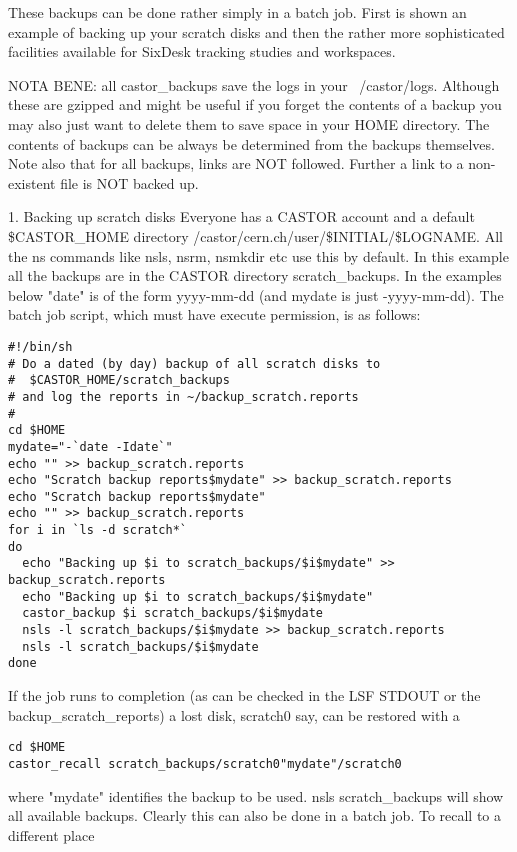 \documentclass{cernatsnote}    %
\begin{document}
 These backups can be done rather simply in a batch job. First is shown an example of 
backing up your scratch disks and then the rather more sophisticated
facilities available for SixDesk tracking studies and workspaces.

NOTA BENE: all castor\_backups save the logs in your ~/castor/logs. Although
these are gzipped and might be useful if you forget the contents of a backup
you may also just want to delete them to save space in your HOME directory.
The contents of backups can be always be determined from the backups
themselves. Note also that for all backups, links are NOT followed. Further
a link to a non-existent file is NOT backed up.

 1. Backing up scratch disks
 Everyone has a CASTOR account and a default \$CASTOR\_HOME directory
/castor/cern.ch/user/\$INITIAL/\$LOGNAME. All the ns commands like
nsls, nsrm, nsmkdir etc use this by default. In this example
all the backups are in the CASTOR directory scratch\_backups. 
In the examples below "date" is of the form yyyy-mm-dd (and mydate is
just -yyyy-mm-dd).
The batch job script, which must have execute permission, is as follows:
\begin{verbatim}
#!/bin/sh
# Do a dated (by day) backup of all scratch disks to 
#  $CASTOR_HOME/scratch_backups
# and log the reports in ~/backup_scratch.reports
#
cd $HOME
mydate="-`date -Idate`"
echo "" >> backup_scratch.reports
echo "Scratch backup reports$mydate" >> backup_scratch.reports
echo "Scratch backup reports$mydate"
echo "" >> backup_scratch.reports
for i in `ls -d scratch*`
do
  echo "Backing up $i to scratch_backups/$i$mydate" >> backup_scratch.reports
  echo "Backing up $i to scratch_backups/$i$mydate"
  castor_backup $i scratch_backups/$i$mydate
  nsls -l scratch_backups/$i$mydate >> backup_scratch.reports
  nsls -l scratch_backups/$i$mydate
done
\end{verbatim}

If the job runs to completion (as can be checked in the LSF STDOUT or the 
backup\_scratch\_reports) a lost disk, scratch0 say, can be restored with a

\begin{verbatim}
cd $HOME
castor_recall scratch_backups/scratch0"mydate"/scratch0
\end{verbatim}

where "mydate" identifies the backup to be used. nsls scratch\_backups will show
all available backups. Clearly this can also be done in a batch job.
To recall to a different place
\end{document}
